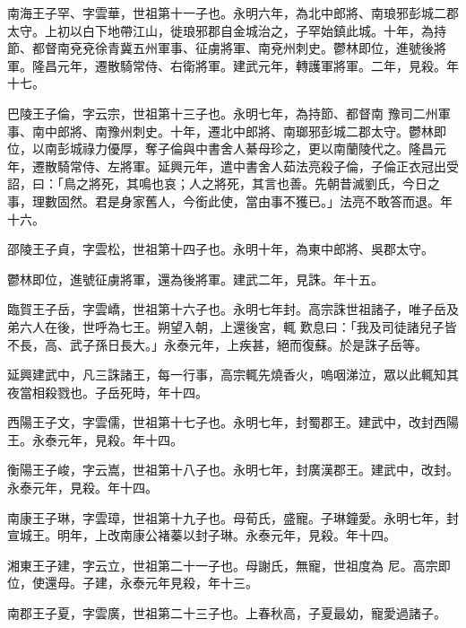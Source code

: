 \begin{pinyinscope}
 南海王子罕、字雲華，世祖第十一子也。永明六年，為北中郎將、南琅邪彭城二郡太守。上初以白下地帶江山，徙琅邪郡自金城治之，子罕始鎮此城。十年，為持節、都督南兗兗徐青冀五州軍事、征虜將軍、南兗州刺史。鬱林即位，進號後將軍。隆昌元年，遷散騎常侍、右衛將軍。建武元年，轉護軍將軍。二年，見殺。年十七。



 巴陵王子倫，字云宗，世祖第十三子也。永明七年，為持節、都督南
 豫司二州軍事、南中郎將、南豫州刺史。十年，遷北中郎將、南瑯邪彭城二郡太守。鬱林即位，以南彭城祿力優厚，奪子倫與中書舍人綦母珍之，更以南蘭陵代之。隆昌元年，遷散騎常侍、左將軍。延興元年，遣中書舍人茹法亮殺子倫，子倫正衣冠出受詔，曰：「鳥之將死，其鳴也哀；人之將死，其言也善。先朝昔滅劉氏，今日之事，理數固然。君是身家舊人，今銜此使，當由事不獲已。」法亮不敢答而退。年十六。



 邵陵王子貞，字雲松，世祖第十四子也。永明十年，為東中郎將、吳郡太守。



 鬱林即位，進號征虜將軍，還為後將軍。建武二年，見誅。年十五。



 臨賀王子岳，字雲嶠，世祖第十六子也。永明七年封。高宗誅世祖諸子，唯子岳及弟六人在後，世呼為七王。朔望入朝，上還後宮，輒
 歎息曰：「我及司徒諸兒子皆不長，高、武子孫日長大。」永泰元年，上疾甚，絕而復蘇。於是誅子岳等。



 延興建武中，凡三誅諸王，每一行事，高宗輒先燒香火，嗚咽涕泣，眾以此輒知其夜當相殺戮也。子岳死時，年十四。



 西陽王子文，字雲儒，世祖第十七子也。永明七年，封蜀郡王。建武中，改封西陽王。永泰元年，見殺。年十四。



 衡陽王子峻，字云嵩，世祖第十八子也。永明七年，封廣漢郡王。建武中，改封。永泰元年，見殺。年十四。



 南康王子琳，字雲璋，世祖第十九子也。母荀氏，盛寵。子琳鐘愛。永明七年，封宣城王。明年，上改南康公褚蓁以封子琳。永泰元年，見殺。年十四。



 湘東王子建，字云立，世祖第二十一子也。母謝氏，無寵，世祖度為
 尼。高宗即位，使還母。子建，永泰元年見殺，年十三。



 南郡王子夏，字雲廣，世祖第二十三子也。上春秋高，子夏最幼，寵愛過諸子。




\end{pinyinscope}
